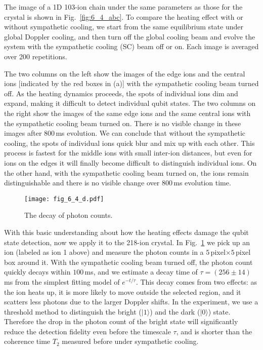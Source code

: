The image of a 1D 103-ion chain under the same parameters as those for the crystal is shown in Fig.~\ref{fig:6_4_abc}. To compare the heating effect with or without sympathetic cooling, we start from the same equilibrium state under global Doppler cooling, and then turn off the global cooling beam and evolve the system with the sympathetic cooling (SC) beam off or on. Each image is averaged over 200 repetitions.

The two columns on the left show the images of the edge ions and the central ions [indicated by the red boxes in (a)] with the sympathetic cooling beam turned off. As the heating dynamics proceeds, the spots of individual ions dim and expand, making it difficult to detect individual qubit states. The two columns on the right show the images of the same edge ions and the same central ions with the sympathetic cooling beam turned on. There is no visible change in these images after $800\,$ms evolution. We can conclude that without the sympathetic cooling, the spots of individual ions quick blur and mix up with each other. This process is fastest for the middle ions with small inter-ion distances, but even for ions on the edges it will finally become difficult to distinguish individual ions. On the other hand, with the sympathetic cooling beam turned on, the ions remain distinguishable and there is no visible change over $800\,$ms evolution time.

\begin{figure}
    \centering
    \texttt{[image: fig\_6\_4\_d.pdf]}    \caption{The decay of photon counts.}
    \label{fig:6_4_d}
\end{figure}

With this basic understanding about how the heating effects damage the qubit state detection, now we apply it to the 218-ion crystal. In Fig.~\ref{fig:6_4_d} we pick up an ion (labeled as ion 1 above) and measure the photon counts in a $5\,$pixel$\times5\,$pixel box around it. With the sympathetic cooling beam turned off, the photon count quickly decays within $100\,$ms, and we estimate a decay time of $\tau=(256\pm14)\,$ms from the simplest fitting model of $e^{-t/\tau}$. This decay comes from two effects: as the ion heats up, it is more likely to move outside the selected region, and it scatters less photons due to the larger Doppler shifts. In the experiment, we use a threshold method to distinguish the bright ($|1\rangle$) and the dark ($|0\rangle$) state. Therefore the drop in the photon count of the bright state will significantly reduce the detection fidelity even before the timescale $\tau$, and is shorter than the coherence time $T_2$ measured before under sympathetic cooling.

